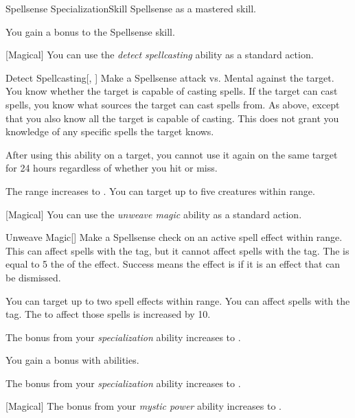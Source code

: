     \begin{feat}{Spellsense Specialization}{Skill}
        \featpre Spellsense as a mastered skill.

         You gain a  bonus to the Spellsense skill.

        [Magical] You can use the \textit{detect spellcasting} ability as a standard action.
        \begin{freeability}{Detect Spellcasting}[, ]
            Make a Spellsense attack vs. Mental against the target.
            \hit You know whether the target is capable of casting spells.
            If the target can cast spells, you know what sources the target can cast spells from.
            \crit As above, except that you also know all  the target is capable of casting.
            This does not grant you knowledge of any specific spells the target knows.

            After using this ability on a target, you cannot use it again on the same target for 24 hours regardless of whether you hit or miss.

            \rankline
             The range increases to \rnglong.
             You can target up to five creatures within range.
        \end{freeability}

        [Magical] You can use the \textit{unweave magic} ability as a standard action.
        \begin{freeability}{Unweave Magic}[]
            Make a Spellsense check on an active spell effect within \rngmed range.
            This can affect spells with the  tag, but it cannot affect spells with the  tag.
            The  is equal to 5 \add the  of the effect.
            Success means the effect is  if it is an effect that can be dismissed.

            \rankline
             You can target up to two spell effects within range.
             You can affect spells with the  tag.
            The  to affect those spells is increased by 10.
        \end{freeability}

         The bonus from your \textit{specialization} ability increases to .

         You gain a  bonus  with  abilities.

         The bonus from your \textit{specialization} ability increases to .

        [Magical] The bonus from your \textit{mystic power} ability increases to .
    \end{feat}

